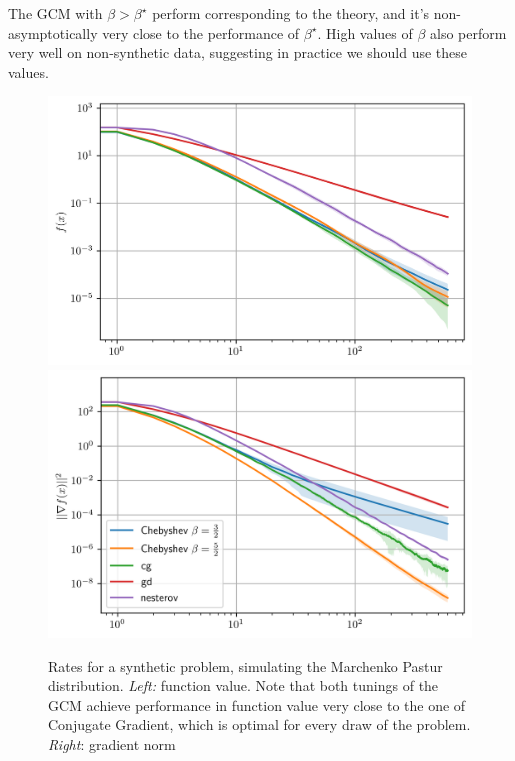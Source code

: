 \documentclass{article}
\begin{document}
The GCM with  $\beta>\beta^\star$ perform corresponding to the theory, and it's non-asymptotically very close to the performance of $\beta^\star$. High values of $\beta$ also perform very well on non-synthetic data, suggesting in practice we should use these values.

\begin{figure}
    \centering
    \includegraphics[width=5 cm]{new_imgs/mp f.png}\includegraphics[width= 5 cm]{new_imgs/mp grad.png}
    
    
    \caption{Rates for a synthetic problem, simulating the Marchenko Pastur distribution. \textit{Left:} function value. Note that both tunings of the GCM achieve performance in function value very close to the one of Conjugate Gradient, which is optimal for every draw of the problem.
 \textit{Right}: gradient norm}
    \label{fig:my_label}
\end{figure}
\end{document}
